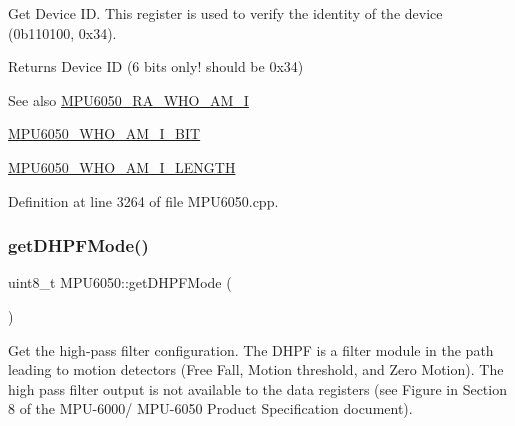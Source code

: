 Get Device ID. This register is used to verify the identity of the device (0b110100, 0x34). \begin{DoxyReturn}{Returns}
Device ID (6 bits only! should be 0x34) 
\end{DoxyReturn}
\begin{DoxySeeAlso}{See also}
\mbox{\hyperlink{MPU6050_8h_a83d60aa4c37e954266ecd17ae02ec174}{M\+P\+U6050\+\_\+\+R\+A\+\_\+\+W\+H\+O\+\_\+\+A\+M\+\_\+I}} 

\mbox{\hyperlink{MPU6050_8h_a3c136677cedb8e974669e70018326ea1}{M\+P\+U6050\+\_\+\+W\+H\+O\+\_\+\+A\+M\+\_\+\+I\+\_\+\+B\+IT}} 

\mbox{\hyperlink{MPU6050_8h_ab07bf191f71bdb7f5edcd2b41f6c0709}{M\+P\+U6050\+\_\+\+W\+H\+O\+\_\+\+A\+M\+\_\+\+I\+\_\+\+L\+E\+N\+G\+TH}} 
\end{DoxySeeAlso}


Definition at line 3264 of file M\+P\+U6050.\+cpp.


\begin{DoxyCode}{0}

\end{DoxyCode}
\mbox{\label{classMPU6050_a4c3b84a906fcb5a65870fa557f797f4a}} 
\subsubsection{\texorpdfstring{getDHPFMode()}{getDHPFMode()}}
{\footnotesize\ttfamily uint8\+\_\+t M\+P\+U6050\+::get\+D\+H\+P\+F\+Mode (\begin{DoxyParamCaption}{ }\end{DoxyParamCaption})}

Get the high-\/pass filter configuration. The D\+H\+PF is a filter module in the path leading to motion detectors (Free Fall, Motion threshold, and Zero Motion). The high pass filter output is not available to the data registers (see Figure in Section 8 of the M\+P\+U-\/6000/ M\+P\+U-\/6050 Product Specification document).

